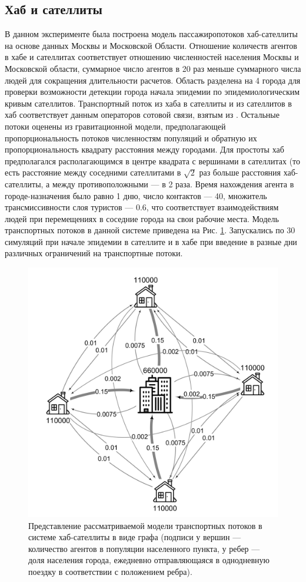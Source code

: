 \documentclass[a4paper,12pt]{article} %
\begin{document}
\subsection{Хаб и сателлиты}
В данном эксперименте была построена модель пассажиропотоков хаб-сателлиты на основе данных Москвы и Московской Области. Отношение количеств агентов в хабе и сателлитах соответствует отношению численностей населения Москвы и Московской области, суммарное число агентов в 20 раз меньше суммарного числа людей для сокращения длительности расчетов. Область разделена на 4 города для проверки возможности детекции города начала эпидемии по эпидемиологическим кривым сателлитов. Транспортный поток из хаба в сателлиты и из сателлитов в хаб соответствует данным операторов сотовой связи, взятым из \cite{makhrova2017work}. Остальные потоки оценены из гравитационной модели, предполагающей пропорциональность потоков численностям популяций и обратную их пропорциональность квадрату расстояния между городами. Для простоты хаб предполагался располагающимся в центре квадрата с вершинами в сателлитах (то есть расстояние между соседними сателлитами в $\sqrt{2}$ раз больше расстояния хаб-сателлиты, а между противоположными --- в 2 раза. Время нахождения агента в городе-назначения было равно 1 дню, число контактов --- 40, множитель трансмиссивности слоя туристов --- 0.6, что соответствует взаимодействиям людей при перемещениях в соседние города на свои рабочие места. Модель транспортных потоков в данной системе приведена на Рис. \ref{pic:graph1}. Запускались по 30 симуляций при начале эпидемии в сателлите и в хабе при введение в разные дни различных ограничений на транспортные потоки.

\begin{figure}[H]
    \centering
    \includegraphics[width=0.6\linewidth]{images/graph1.png}
    \caption{Представление рассматриваемой модели транспортных потоков в системе хаб-сателлиты в виде графа (подписи у вершин --- количество агентов в популяции населенного пункта, у ребер --- доля населения города, ежедневно отправляющаяся в однодневную поездку в соответствии с положением ребра).}
    \label{pic:graph1}
\end{figure}
\end{document}
